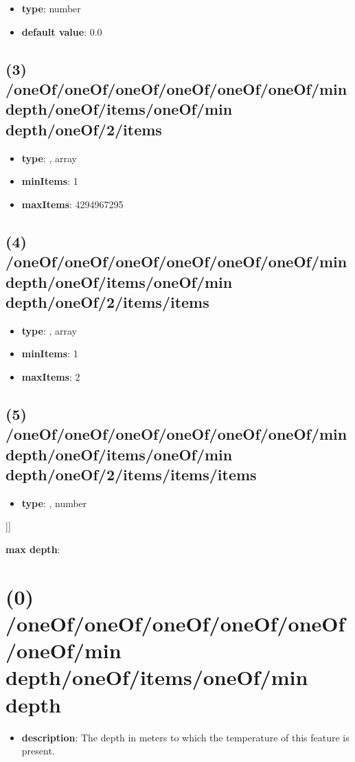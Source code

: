 \begin{itemize}[leftmargin=4em]\item {\bf type}: number\item {\bf default value}: 0.0
\end{itemize}\subsection{(3) /oneOf/oneOf/oneOf/oneOf/oneOf/oneOf/min depth/oneOf/items/oneOf/min depth/oneOf/2/items}
\begin{itemize}[leftmargin=3em]\item {\bf type}: , array\item {\bf minItems}: 1
\item {\bf maxItems}: 4294967295
\end{itemize}\subsection{(4) /oneOf/oneOf/oneOf/oneOf/oneOf/oneOf/min depth/oneOf/items/oneOf/min depth/oneOf/2/items/items}
\begin{itemize}[leftmargin=4em]\item {\bf type}: , array\item {\bf minItems}: 1
\item {\bf maxItems}: 2
\end{itemize}\subsection{(5) /oneOf/oneOf/oneOf/oneOf/oneOf/oneOf/min depth/oneOf/items/oneOf/min depth/oneOf/2/items/items/items}
\begin{itemize}[leftmargin=5em]\item {\bf type}: , number\end{itemize}]]\item {\bf max depth}: \section{(0) /oneOf/oneOf/oneOf/oneOf/oneOf/oneOf/min depth/oneOf/items/oneOf/min depth}
\begin{itemize}[leftmargin=0em]\item {\bf description}: The depth in meters to which the temperature of this feature is present.
\end{itemize}
